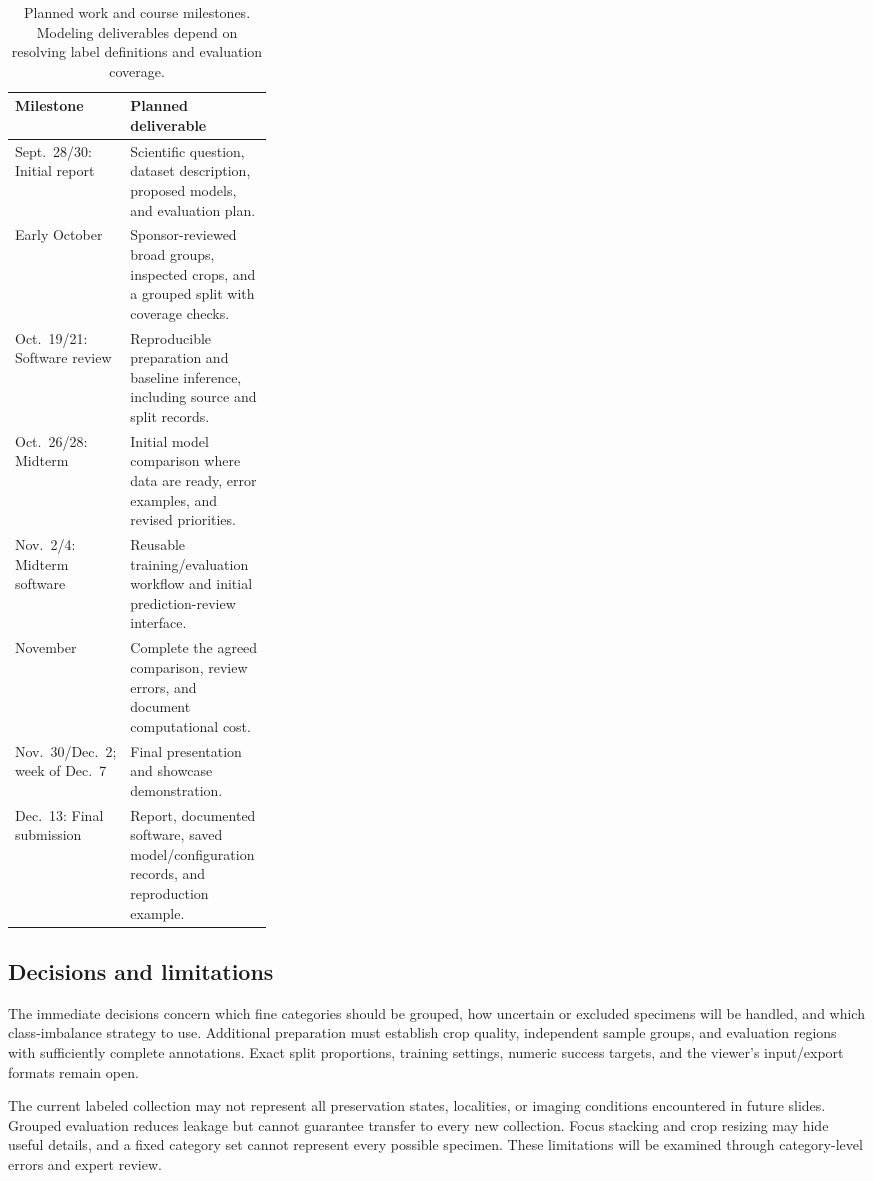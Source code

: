 \documentclass[conference,letterpaper]{IEEEtran}
\begin{document}
\begin{table}[t]
\centering
\caption{Planned work and course milestones. Modeling deliverables depend on resolving label definitions and evaluation coverage.}
\label{tab:schedule}
\begin{tabularx}{\linewidth}{>{\raggedright\arraybackslash}p{0.30\linewidth}Y}
\toprule
Milestone & Planned deliverable \\
\midrule
Sept.\ 28/30: Initial report & Scientific question, dataset description, proposed models, and evaluation plan. \\
Early October & Sponsor-reviewed broad groups, inspected crops, and a grouped split with coverage checks. \\
Oct.\ 19/21: Software review & Reproducible preparation and baseline inference, including source and split records. \\
Oct.\ 26/28: Midterm & Initial model comparison where data are ready, error examples, and revised priorities. \\
Nov.\ 2/4: Midterm software & Reusable training/evaluation workflow and initial prediction-review interface. \\
November & Complete the agreed comparison, review errors, and document computational cost. \\
Nov.\ 30/Dec.\ 2; week of Dec.\ 7 & Final presentation and showcase demonstration. \\
Dec.\ 13: Final submission & Report, documented software, saved model/configuration records, and reproduction example. \\
\bottomrule
\end{tabularx}
\end{table}

\subsection{Decisions and limitations}
The immediate decisions concern which fine categories should be grouped, how uncertain or excluded specimens will be handled, and which class-imbalance strategy to use. Additional preparation must establish crop quality, independent sample groups, and evaluation regions with sufficiently complete annotations. Exact split proportions, training settings, numeric success targets, and the viewer's input/export formats remain open.

The current labeled collection may not represent all preservation states, localities, or imaging conditions encountered in future slides. Grouped evaluation reduces leakage but cannot guarantee transfer to every new collection. Focus stacking and crop resizing may hide useful details, and a fixed category set cannot represent every possible specimen. These limitations will be examined through category-level errors and expert review.
\end{document}
